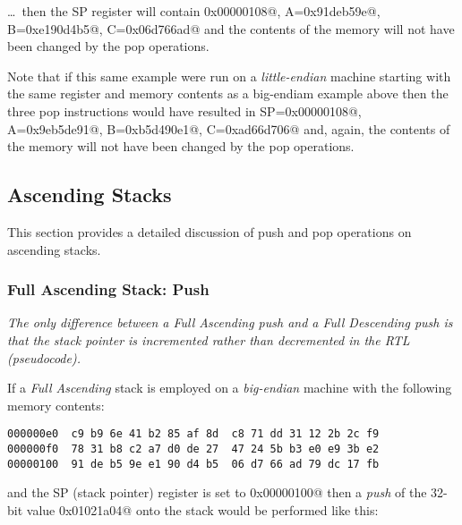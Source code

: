 \documentclass[10pt,letterpaper]{article}
\begin{document}
\ldots\ then the SP register will contain \verb@0x00000108@, 
A=\verb@0x91deb59e@, B=\verb@0xe190d4b5@, C=\verb@0x06d766ad@ and 
the contents of the memory will not have been changed by the pop operations.

\begin{tcolorbox}
Note that if this same example were run on a {\em little-endian} machine
starting with the same register and memory contents as a big-endiam example above 
then the three pop instructions would have resulted in SP=\verb@0x00000108@,
A=\verb@0x9eb5de91@, B=\verb@0xb5d490e1@, C=\verb@0xad66d706@ and, again,
the contents of the memory will not have been changed by the pop operations.
\end{tcolorbox}







\subsection{Ascending Stacks}

This section provides a detailed discussion of push and pop operations
on ascending stacks.

\subsubsection{Full Ascending Stack: Push}

{\em The only difference between a Full Ascending push and a Full Descending push 
is that the stack pointer is incremented rather than decremented in the RTL (pseudocode).}

If a {\em Full Ascending} stack is employed on a {\em big-endian} machine
with the following memory contents:
\begin{verbatim}
000000e0  c9 b9 6e 41 b2 85 af 8d  c8 71 dd 31 12 2b 2c f9
000000f0  78 31 b8 c2 a7 d0 de 27  47 24 5b b3 e0 e9 3b e2
00000100  91 de b5 9e e1 90 d4 b5  06 d7 66 ad 79 dc 17 fb
\end{verbatim}
and the SP (stack pointer) register is set to \verb@0x00000100@ then 
a {\em push} of the 32-bit value \verb@0x01021a04@ onto the stack would be 
performed like this:
\end{document}
